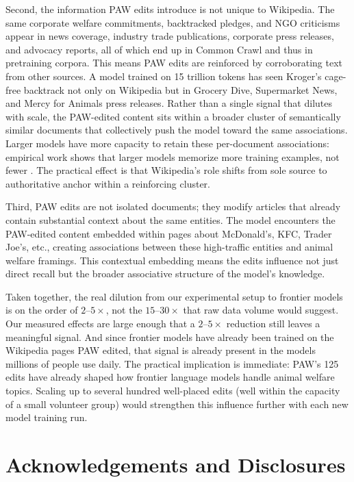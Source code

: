 \documentclass{article}
\begin{document}
Second, the information PAW edits introduce is not unique to Wikipedia. The same corporate welfare commitments, backtracked pledges, and NGO criticisms appear in news coverage, industry trade publications, corporate press releases, and advocacy reports, all of which end up in Common Crawl and thus in pretraining corpora. This means PAW edits are reinforced by corroborating text from other sources. A model trained on 15 trillion tokens has seen Kroger's cage-free backtrack not only on Wikipedia but in Grocery Dive, Supermarket News, and Mercy for Animals press releases. Rather than a single signal that dilutes with scale, the PAW-edited content sits within a broader cluster of semantically similar documents that collectively push the model toward the same associations. Larger models have more capacity to retain these per-document associations: empirical work shows that larger models memorize more training examples, not fewer \citep{carlini2023poisoning}. The practical effect is that Wikipedia's role shifts from sole source to authoritative anchor within a reinforcing cluster.

Third, PAW edits are not isolated documents; they modify articles that already contain substantial context about the same entities. The model encounters the PAW-edited content embedded within pages about McDonald's, KFC, Trader Joe's, etc., creating associations between these high-traffic entities and animal welfare framings. This contextual embedding means the edits influence not just direct recall but the broader associative structure of the model's knowledge.

Taken together, the real dilution from our experimental setup to frontier models is on the order of $2$--$5\times$, not the $15$--$30\times$ that raw data volume would suggest. Our measured effects are large enough that a $2$--$5\times$ reduction still leaves a meaningful signal. And since frontier models have already been trained on the Wikipedia pages PAW edited, that signal is already present in the models millions of people use daily. The practical implication is immediate: PAW's 125 edits have already shaped how frontier language models handle animal welfare topics. Scaling up to several hundred well-placed edits (well within the capacity of a small volunteer group) would strengthen this influence further with each new model training run.

\section{Acknowledgements and Disclosures}
\end{document}
